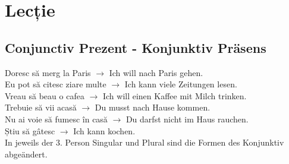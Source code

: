 \documentclass[11pt, oneside]{article}
\begin{document}
\section{Lecție}

\subsection{Conjunctiv Prezent - Konjunktiv Präsens}
Doresc să merg la Paris $\rightarrow$ Ich will nach Paris gehen.\\
Eu pot să citesc ziare multe $\rightarrow$ Ich kann viele Zeitungen lesen.\\
Vreau să beau o cafea $\rightarrow$ Ich will einen Kaffee mit Milch trinken.\\
Trebuie să vii acasă $\rightarrow$ Du musst nach Hause kommen.\\
Nu ai voie să fumesc în casă $\rightarrow$ Du darfst nicht im Haus rauchen.\\
Știu să gâtesc $\rightarrow$ Ich kann kochen.\\
\newline
In jeweils der 3. Person Singular und Plural sind die Formen des Konjunktiv 
abgeändert.
\end{document}
